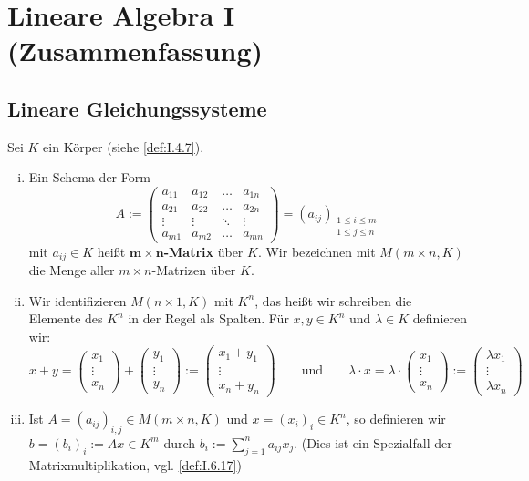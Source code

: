 \chapter{Lineare Algebra I (Zusammenfassung)} %
\label{cha:1}
\setcounter{section}{2}
\section{Lineare Gleichungssysteme}
\setcounter{definition}{4}
\begin{definition}[Matrix]
	\label{def:I.3.5}
	Sei $K$ ein Körper (siehe \autoref{def:I.4.7}).
	\begin{enumerate}[(i)]
		\item Ein Schema der Form
		\[
			A := \begin{pmatrix}
				a_{11} & a_{12} & \dots & a_{1n} \\
				a_{21} & a_{22} & \dots & a_{2n} \\
				\vdots & \vdots & \ddots & \vdots \\
				a_{m1} & a_{m2} & \dots & a_{mn}
			\end{pmatrix} = (a_{ij})_{\substack{1 \leq i \leq m \\ 1 \leq j \leq n}}
		\]
		mit $a_{ij} \in K$ heißt $\bm{m \times n}$\textbf{-Matrix} über $K$. 
		Wir bezeichnen mit $M(m \times n,K)$ die Menge aller $m \times n$-Matrizen über $K$.
		\item Wir identifizieren $M(n \times 1,K)$ mit $K^n$, das heißt wir schreiben die Elemente des $K^n$ in der Regel als Spalten.
		Für $x,y \in K^n$ und $\lambda \in K$ definieren wir:
		\[
			x+y = \begin{pmatrix} x_1 \\ \vdots \\ x_n \end{pmatrix} + \begin{pmatrix} y_1 \\ \vdots \\ y_n \end{pmatrix} := \begin{pmatrix} x_1 + y_1 \\ \vdots \\ x_n + y_n \end{pmatrix} \qquad \text{und} \qquad \lambda \cdot x = \lambda \cdot \begin{pmatrix} x_1 \\ \vdots \\ x_n \end{pmatrix} := \begin{pmatrix} \lambda x_1 \\ \vdots \\ \lambda x_n \end{pmatrix}
		\]
		\item Ist $A = (a_{ij})_{i,j} \in M(m \times n,K)$ und $x = (x_i)_i \in K^n$, so definieren wir $b = (b_i)_i := Ax \in K^m$ durch $b_i := \sum\limits_{j=1}^n a_{ij}x_j$.
		(Dies ist ein Spezialfall der Matrixmultiplikation, vgl. \autoref{def:I.6.17})
	\end{enumerate}
\end{definition}

